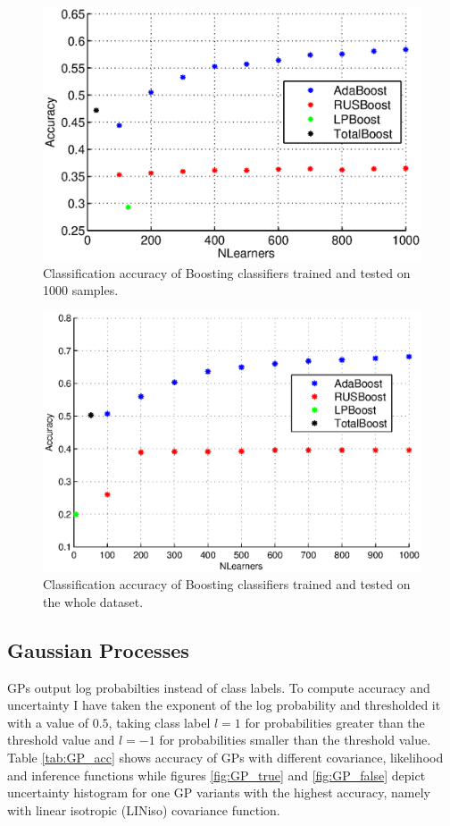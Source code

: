 \documentclass[journal, a4paper]{IEEEtran}
\begin{document}
    \begin{figure}[h]    
      \centering
      \includegraphics[width=\linewidth]{boost_plot_small}
      \caption{Classification accuracy of Boosting classifiers trained and tested on 1000 samples.}
      \label{fig:boost_accuracy_small}
    \end{figure}
    
    \begin{figure}[h]    
      \centering
      \includegraphics[width=\linewidth]{boost_plot_big}
      \caption{Classification accuracy of Boosting classifiers trained and tested on the whole dataset.}
      \label{fig:boost_accuracy_small}
    \end{figure}
    
   
  \subsection{Gaussian Processes}
      GPs output log probabilties instead of class labels. To compute accuracy and uncertainty I have taken the exponent of the log probability and thresholded it with a value of $0.5$, taking class label $l=1$ for probabilities greater than the threshold value and $l=-1$ for probabilities smaller than the threshold value. Table \ref{tab:GP_acc} shows accuracy of GPs with different covariance, likelihood and inference functions while figures \ref{fig:GP_true} and \ref{fig:GP_false} depict uncertainty histogram for one GP variants with the highest accuracy, namely with linear isotropic (LINiso) covariance function.
      
\end{document}
